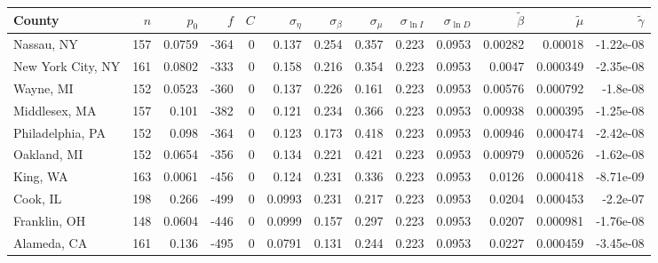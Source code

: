 \documentclass[12pt,letterpaper]{article}
\begin{document}
{\begin{appendices}
\begin{sidewaystable}
{\begin{tabular}{lrrrrrrrrrrrr}
\hline
 County             &   $n$ &   $p_0$ &    $f$ &   $C$ &   $\sigma_\eta$ &   $\sigma_\beta$ &   $\sigma_\mu$ &   $\sigma_{\ln I}$ &   $\sigma_{\ln D}$ &   $\tilde{\beta}$ &   $\tilde{\mu}$ &   $\tilde\gamma$ \\
\hline
 Nassau, NY         & 157   & 0.0759  & -364   &     0 &          0.137  &           0.254  &         0.357  &              0.223 &             0.0953 &           0.00282 &        0.00018  &       -1.22e-08  \\
 New York City, NY  & 161   & 0.0802  & -333   &     0 &          0.158  &           0.216  &         0.354  &              0.223 &             0.0953 &           0.0047  &        0.000349 &       -2.35e-08  \\
 Wayne, MI          & 152   & 0.0523  & -360   &     0 &          0.137  &           0.226  &         0.161  &              0.223 &             0.0953 &           0.00576 &        0.000792 &       -1.8e-08   \\
 Middlesex, MA      & 157   & 0.101   & -382   &     0 &          0.121  &           0.234  &         0.366  &              0.223 &             0.0953 &           0.00938 &        0.000395 &       -1.25e-08  \\
 Philadelphia, PA   & 152   & 0.098   & -364   &     0 &          0.123  &           0.173  &         0.418  &              0.223 &             0.0953 &           0.00946 &        0.000474 &       -2.42e-08  \\
 Oakland, MI        & 152   & 0.0654  & -356   &     0 &          0.134  &           0.221  &         0.421  &              0.223 &             0.0953 &           0.00979 &        0.000526 &       -1.62e-08  \\
 King, WA           & 163   & 0.0061  & -456   &     0 &          0.124  &           0.231  &         0.336  &              0.223 &             0.0953 &           0.0126  &        0.000418 &       -8.71e-09  \\
 Cook, IL           & 198   & 0.266   & -499   &     0 &          0.0993 &           0.231  &         0.217  &              0.223 &             0.0953 &           0.0204  &        0.000453 &       -2.2e-07   \\
 Franklin, OH       & 148   & 0.0604  & -446   &     0 &          0.0999 &           0.157  &         0.297  &              0.223 &             0.0953 &           0.0207  &        0.000981 &       -1.76e-08  \\
 Alameda, CA        & 161   & 0.136   & -495   &     0 &          0.0791 &           0.131  &         0.244  &              0.223 &             0.0953 &           0.0227  &        0.000459 &       -3.45e-08  \\

\end{tabular}}
\end{sidewaystable}
\end{appendices}}
\end{document}
